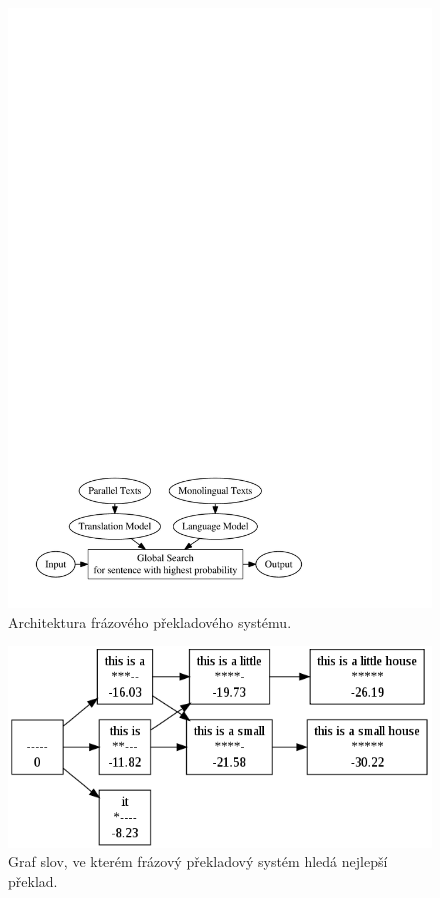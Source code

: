 \documentclass[12pt,a4paper]{report}
\begin{document}
\begin{figure}[t]
\centerline{\mbox{\includegraphics[width=120mm]{pictures/phrase-based}}}
\caption{Architektura frázového překladového systému.}
\label{phrase-based}
\end{figure}

\begin{figure}[t]
\centerline{\mbox{\includegraphics[width=120mm]{pictures/lattice}}}
\caption{Graf slov, ve kterém frázový překladový systém hledá nejlepší překlad.}
\label{lattice}
\end{figure}
\end{document}
